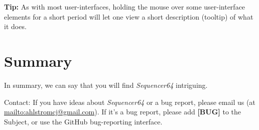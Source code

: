 \documentclass[
 11pt,
 twoside,
 a4paper,
 headinclude,
 footinclude,
 final                                 %
]{article}
\begin{document}
   \textbf{Tip:}
   As with most user-interfaces, holding the mouse over some user-interface
   elements for a short period will let one view a short description (tooltip)
   of what it does.


\rhead{\rightmark}         %








































%
% 

%
% 

\section{Summary}
\label{sec:summary}

   In summary, we can say that you will find \textsl{Sequencer64} intriguing.

   Contact: If you have ideas about \textsl{Sequencer64} or a bug report, please
   email us (at \url{mailto:ahlstromcj@gmail.com}).
   If it's a bug report, please add \textbf{[BUG]} to the Subject, or use the
   GitHub bug-reporting interface.




\printindex
\end{document}
